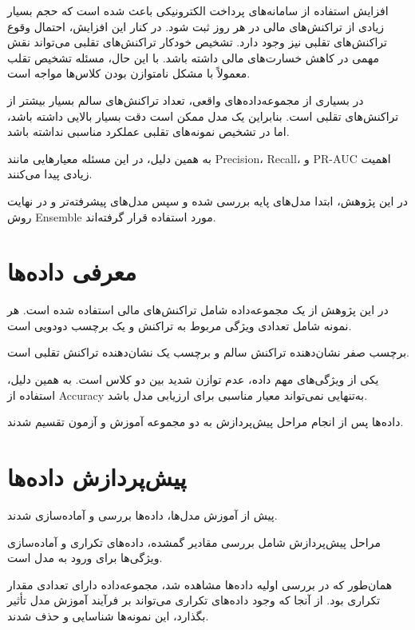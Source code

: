 \documentclass[10pt,a4paper,twocolumn]{article}
\begin{document}
افزایش استفاده از سامانه‌های پرداخت الکترونیکی باعث شده است
که حجم بسیار زیادی از تراکنش‌های مالی در هر روز ثبت شود.
در کنار این افزایش، احتمال وقوع تراکنش‌های تقلبی نیز وجود دارد.
تشخیص خودکار تراکنش‌های تقلبی می‌تواند نقش مهمی در کاهش
خسارت‌های مالی داشته باشد. با این حال، مسئله تشخیص تقلب
معمولاً با مشکل نامتوازن بودن کلاس‌ها مواجه است.

در بسیاری از مجموعه‌داده‌های واقعی، تعداد تراکنش‌های سالم
بسیار بیشتر از تراکنش‌های تقلبی است. بنابراین یک مدل ممکن است
دقت بسیار بالایی داشته باشد، اما در تشخیص نمونه‌های تقلبی
عملکرد مناسبی نداشته باشد.

به همین دلیل، در این مسئله معیارهایی مانند Precision،
Recall،  و PR-AUC اهمیت زیادی پیدا می‌کنند.

در این پژوهش، ابتدا مدل‌های پایه بررسی شده و سپس مدل‌های
پیشرفته‌تر و در نهایت روش Ensemble مورد استفاده قرار گرفته‌اند.


\section{معرفی داده‌ها}

در این پژوهش از یک مجموعه‌داده شامل تراکنش‌های مالی استفاده
شده است. هر نمونه شامل تعدادی ویژگی مربوط به تراکنش و یک
برچسب دودویی است.

برچسب صفر نشان‌دهنده تراکنش سالم و برچسب یک نشان‌دهنده
تراکنش تقلبی است.

یکی از ویژگی‌های مهم داده، عدم توازن شدید بین دو کلاس است.
به همین دلیل، استفاده از Accuracy به‌تنهایی نمی‌تواند معیار
مناسبی برای ارزیابی مدل باشد.

داده‌ها پس از انجام مراحل پیش‌پردازش به دو مجموعه آموزش و
آزمون تقسیم شدند.


\section{پیش‌پردازش داده‌ها}

پیش از آموزش مدل‌ها، داده‌ها بررسی و آماده‌سازی شدند.

مراحل پیش‌پردازش شامل بررسی مقادیر گمشده، داده‌های تکراری
و آماده‌سازی ویژگی‌ها برای ورود به مدل است.

همان‌طور که در بررسی اولیه داده‌ها مشاهده شد، مجموعه‌داده
دارای تعدادی مقدار تکراری بود. از آنجا که وجود داده‌های
تکراری می‌تواند بر فرآیند آموزش مدل تأثیر بگذارد، این
نمونه‌ها شناسایی و حذف شدند.
\end{document}
